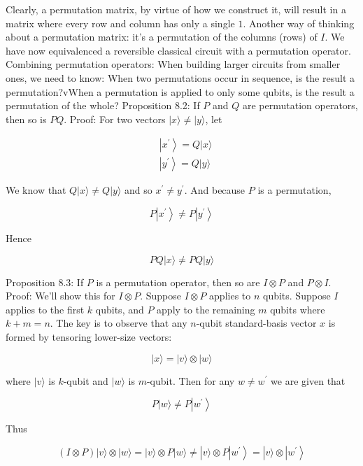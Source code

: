 \documentclass[main.tex]{subfiles}
\begin{document}
    Clearly, a permutation matrix, by virtue of how we construct it, will result in a matrix where every row and column has only a single $1$. Another way of thinking about a permutation matrix: it's a permutation of the columns (rows) of $I$. We have now equivalenced a reversible classical circuit with a permutation operator. Combining permutation operators: When building larger circuits from smaller ones, we need to know: When two permutations occur in sequence, is the result a permutation?vWhen a permutation is applied to only some qubits, is the result a permutation of the whole? Proposition 8.2: If $P$ and $Q$ are permutation operators, then so is $PQ$. Proof: For two vectors $|x\rangle \neq|y\rangle$, let
    
    $$
    \begin{aligned}
    &\left|x^{\prime}\right\rangle=Q|x\rangle \\
    &\left|y^{\prime}\right\rangle=Q|y\rangle
    \end{aligned}
    $$
    
    We know that $Q|x\rangle \neq Q|y\rangle$ and so $x^{\prime} \neq y^{\prime}$. And because $P$ is a permutation,
    
    $$
    P\left|x^{\prime}\right\rangle \neq P\left|y^{\prime}\right\rangle
    $$
    
    Hence
    
    $$
    P Q|x\rangle \neq P Q|y\rangle
    $$
    
    Proposition 8.3: If $P$ is a permutation operator, then so are $I \otimes P$ and $P \otimes I$.
    Proof: We'll show this for $I \otimes P$. Suppose $I \otimes P$ applies to $n$ qubits. Suppose $I$ applies to the first $k$ qubits, and $P$ apply to the remaining $m$ qubits where $k+m=n$. The key is to observe that any $n$-qubit standard-basis vector $x$ is formed by tensoring lower-size vectors:
    
    $$
    |x\rangle=|v\rangle \otimes|w\rangle
    $$
    
    where $|v\rangle$ is $k$-qubit and $|w\rangle$ is $m$-qubit. Then for any $w \neq w^{\prime}$ we are given that
    
    $$
    P|w\rangle \neq P\left|w^{\prime}\right\rangle
    $$
    
    Thus
    
    $$
    (I \otimes P)|v\rangle \otimes|w\rangle=|v\rangle \otimes P|w\rangle \neq|v\rangle \otimes P\left|w^{\prime}\right\rangle=|v\rangle \otimes\left|w^{\prime}\right\rangle
    $$
    
\end{document}
